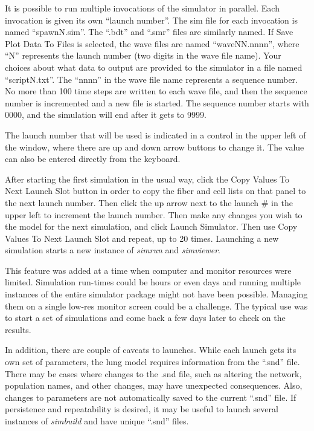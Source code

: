 \documentclass[12pt,openany,oneside]{book}
\newcommand{\prog}[1]{\textit{{#1}}}
\newcommand{\ext}[1]{{{``.#1''}}}
\newcommand{\inquotes}[1]{{{``#1''}}}
\begin{document}
It is possible to run multiple invocations of the simulator in parallel.
Each invocation is given its own \inquotes{launch number}. The sim file
for each invocation is named \inquotes{spawnN.sim}. The \ext{bdt} and
\ext{smr} files are similarly named.  If Save Plot Data To Files is
selected, the wave files are named \inquotes{waveNN.nnnn}, where
\inquotes{N} represents the launch number (two digits in the wave file
name). Your choices about what data to output are provided to the
simulator in a file named \inquotes{scriptN.txt}. The \inquotes{nnnn} in
the wave file name represents a sequence number. No more than 100 time
steps are written to each wave file, and then the sequence number is
incremented and a new file is started. The sequence number starts with
0000, and the simulation will end after it gets to 9999.

The launch number that will be used is indicated in
a control in the upper left of the window, where there are up and down
arrow buttons to change it. The value can also be entered directly from
the keyboard.

After starting the first simulation in the usual way, click the Copy
Values To Next Launch Slot button in order to copy the fiber and cell
lists on that panel to the next launch number. Then click the up arrow
next to the launch \# in the upper left to increment the launch number.
Then make any changes you wish to the model for the next simulation, and
click Launch Simulator. Then use Copy Values To Next Launch Slot and
repeat, up to 20 times. Launching a new simulation starts a new instance
of \prog{simrun} and \prog{simviewer}.

This feature was added at a time when computer and monitor resources were
limited. Simulation run-times could be hours or even days and running
multiple instances of the entire simulator package might not have been
possible. Managing them on a single low-res monitor screen could be a
challenge. The typical use was to start a set of simulations and come back
a few days later to check on the results.

In addition, there are couple of caveats to
launches. While each launch gets its own set
of parameters, the lung model requires information from the \ext{snd}
file. There may be cases where changes to the .snd file, such as altering
the network, population names, and other changes, may have unexpected
consequences. Also, changes to parameters are not automatically saved to
the current \ext{snd} file. If persistence and repeatability is desired,
it may be useful to launch several instances of \prog{simbuild} and have
unique \ext{snd} files. 
\end{document}
